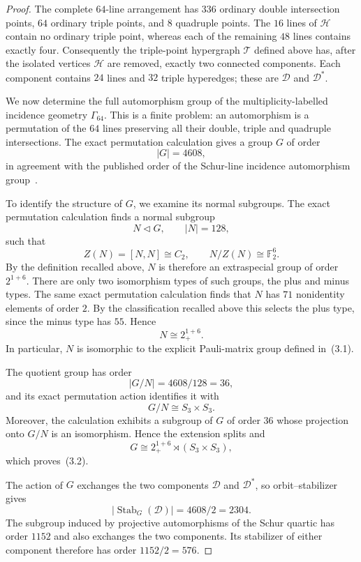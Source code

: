 \documentclass[10pt]{article}
\begin{document}
\begin{proof}
The complete $64$-line arrangement has $336$ ordinary double
intersection points, $64$ ordinary triple points, and $8$ quadruple
points.  The $16$ lines of $\mathcal H$ contain no ordinary triple
point, whereas each of the remaining $48$ lines contains exactly four.
Consequently the triple-point hypergraph $\mathcal T$ defined above has,
after the isolated vertices $\mathcal H$ are removed, exactly two
connected components.  Each component contains $24$ lines and $32$
triple hyperedges; these are $\mathcal D$ and $\mathcal D^*$.

We now determine the full automorphism group of the multiplicity-labelled
incidence geometry $\Gamma_{64}$.  This is a finite problem: an
automorphism is a permutation of the $64$ lines preserving all their
double, triple and quadruple intersections.  The exact permutation
calculation gives a group $G$ of order
\[
|G|=4608,
\]
in agreement with the published order of the Schur-line incidence
automorphism group~\cite{DR25}.

To identify the structure of $G$, we examine its normal subgroups.  The
exact permutation calculation finds a normal subgroup
\[
N\triangleleft G,\qquad |N|=128,
\]
such that
\[
Z(N)=[N,N]\cong C_2,
\qquad
N/Z(N)\cong\mathbb F_2^6.
\]
By the definition recalled above, $N$ is therefore an extraspecial group
of order $2^{1+6}$.  There are only two isomorphism types of such groups,
the plus and minus types.  The same exact permutation calculation finds
that $N$ has $71$ nonidentity elements of order $2$.  By the
classification recalled above this selects the plus type, since the
minus type has $55$.  Hence
\[
N\cong2_{+}^{1+6}.
\]
In particular, $N$ is isomorphic to the explicit Pauli-matrix group
defined in~(3.1).

The quotient group has order
\[
|G/N|=4608/128=36,
\]
and its exact permutation action identifies it with
\[
G/N\cong S_3\times S_3.
\]
Moreover, the calculation exhibits a subgroup of $G$ of order $36$
whose projection onto $G/N$ is an isomorphism.  Hence the extension
splits and
\[
G\cong2_{+}^{1+6}\rtimes(S_3\times S_3),
\]
which proves~(3.2).

The action of $G$ exchanges the two components
$\mathcal D$ and $\mathcal D^*$, so orbit--stabilizer gives
\[
|\operatorname{Stab}_G(\mathcal D)|=4608/2=2304.
\]
The subgroup induced by projective automorphisms of the Schur quartic
has order $1152$ and also exchanges the two components.  Its stabilizer
of either component therefore has order $1152/2=576$.
\end{proof}
\end{document}
